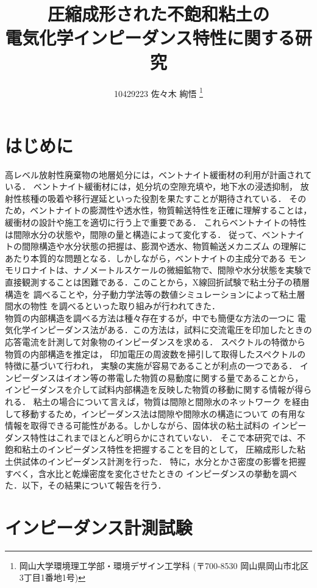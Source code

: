 \documentclass{jsce}
\title{
圧縮成形された不飽和粘土の\\
電気化学インピーダンス特性に関する研究
}%
\author{
10429223 佐々木 絢悟
\thanks{岡山大学環境理工学部・環境デザイン工学科 (〒700-8530 岡山県岡山市北区3丁目1番地1号)}
}
\begin{document}
\maketitle
\section{はじめに}
高レベル放射性廃棄物の地層処分には，ベントナイト緩衝材の利用が計画されている．
ベントナイト緩衝材には，処分坑の空隙充填や，地下水の浸透抑制，
放射性核種の吸着や移行遅延といった役割を果たすことが期待されている．
そのため，ベントナイトの膨潤性や透水性，物質輸送特性を正確に理解することは，
緩衝材の設計や施工を適切に行う上で重要である．
これらベントナイトの特性は間隙水分の状態や，間隙の量と構造によって変化する．
従って、ベントナイトの間隙構造や水分状態の把握は、膨潤や透水、物質輸送メカニズム
の理解にあたり本質的な問題となる．しかしながら，ベントナイトの主成分である
モンモリロナイトは、ナノメートルスケールの微細鉱物で、間隙や水分状態を実験で
直接観測することは困難である．このことから，X線回折試験で粘土分子の積層構造を
調べることや，分子動力学法等の数値シミュレーションによって粘土層間水の物性
を調べるといった取り組みが行われてきた．\\
\hspace{\parindent}物質の内部構造を調べる方法は種々存在するが，中でも簡便な方法の一つに
電気化学インピーダンス法がある．この方法は，試料に交流電圧を印加したときの
応答電流を計測して対象物のインピーダンスを求める．
スペクトルの特徴から物質の内部構造を推定は，
印加電圧の周波数を掃引して取得したスペクトルの特徴に基づいて行われ，
実験の実施が容易であることが利点の一つである．
インピーダンスはイオン等の帯電した物質の易動度に関する量であることから，
インピーダンスを介して試料内部構造を反映した物質の移動に関する情報が得られる．
粘土の場合について言えば，物質は間隙と間隙水のネットワーク
を経由して移動するため，インピーダンス法は間隙や間隙水の構造について
の有用な情報を取得できる可能性がある。しかしながら、固体状の粘土試料の
インピーダンス特性はこれまでほとんど明らかにされていない．
そこで本研究では、不飽和粘土のインピーダンス特性を把握することを目的として，
圧縮成形した粘土供試体のインピーダンス計測を行った．
特に，水分とかさ密度の影響を把握すべく，含水比と乾燥密度を変化させたときの
インピーダンスの挙動を調べた．以下，その結果について報告を行う．
\section{インピーダンス計測試験}
\end{document}
